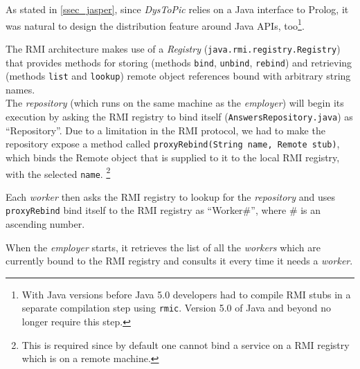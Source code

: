 \documentclass[a4paper, 11pt, oneside]{duthesis}
\begin{document}
As stated in \ref{ssec_jasper}, since \emph{DysToPic} relies on a Java interface to Prolog, it was natural to design the distribution feature around Java APIs, too\footnote{With Java versions before Java 5.0 developers had to compile RMI stubs in a separate compilation step using \texttt{rmic}. Version 5.0 of Java and beyond no longer require this step.}.

The RMI architecture makes use of a \emph{Registry} (\verb$java.rmi.registry.Registry$) that provides methods for storing (methods \texttt{bind}, \texttt{unbind}, \texttt{rebind}) and retrieving (methods \texttt{list} and \texttt{lookup}) remote object references bound with arbitrary string names.\\

The \emph{repository} (which runs on the same machine as the \emph{employer}) will begin its execution by asking the RMI registry to bind itself (\verb$AnswersRepository.java$) as ``Repository''.
Due to a limitation in the RMI protocol, we had to make the repository expose a method called \texttt{proxyRebind(String name, Remote stub)}, which binds the Remote object that is supplied to it to the local RMI registry, with the selected \texttt{name}.
\footnote{This is required since by default one cannot bind a service on a RMI registry which is on a remote machine.}

Each \emph{worker} then asks the RMI registry to lookup for the \emph{repository} and uses \texttt{proxyRebind} bind itself to the RMI registry as ``Worker\#'', where \# is an ascending number.

When the \emph{employer} starts, it retrieves the list of all the \emph{workers} which are currently bound to the RMI registry and consults it every time it needs a \emph{worker}.
\end{document}
